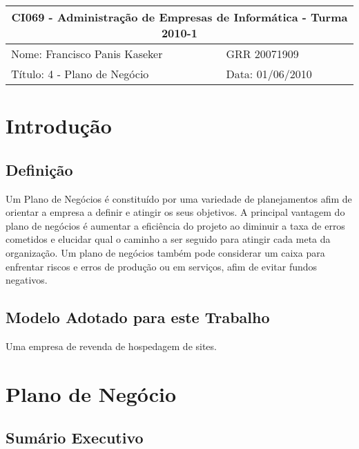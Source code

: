 \documentclass[12pt]{article}
\begin{document}
\setlength{\parskip}{2ex}

\begin{tabular}[l]{ | p{10cm} | l | }
  \hline
  \multicolumn{2}{|c|}{CI069 - Administração de Empresas de Informática - Turma 2010-1} \\
  \hline
  Nome: Francisco Panis Kaseker & 
  GRR 20071909 \\
  \hline
  Título: 4 - Plano de Negócio &
  Data: 01/06/2010 \\
  \hline
\end{tabular}


\vspace{2cm}


\section{Introdução}

\subsection{Definição}

Um Plano de Negócios é constituído por uma variedade de planejamentos afim de orientar a empresa a definir e atingir os seus objetivos. A principal vantagem do plano de negócios é aumentar a eficiência do projeto ao diminuir a taxa de erros cometidos e elucidar qual o caminho a ser seguido para atingir cada meta da organização. Um plano de negócios também pode considerar um caixa para enfrentar riscos e erros de produção ou em serviços, afim de evitar fundos negativos.

\subsection{Modelo Adotado para este Trabalho}
Uma empresa de revenda de hospedagem de sites.


\section{Plano de Negócio}

\subsection{Sumário Executivo}
\end{document}
